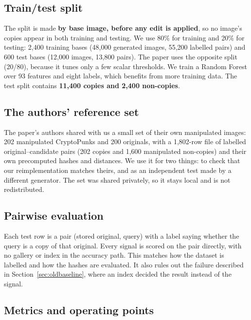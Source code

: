 \subsection{Train/test split}

The split is made \textbf{by base image, before any edit is applied}, so no image's copies
appear in both training and testing. We use 80\% for training and 20\% for testing: 2,400
training bases (48,000 generated images, 55,200 labelled pairs) and 600 test bases (12,000
images, 13,800 pairs). The paper uses the opposite split (20/80), because it tunes only a few
scalar thresholds. We train a Random Forest over 93 features and eight labels, which benefits
from more training data. The test split contains \textbf{11,400 copies and 2,400 non-copies}.

\subsection{The authors' reference set}

The paper's authors shared with us a small set of their own manipulated images: 202
manipulated CryptoPunks and 200 originals, with a 1,802-row file of labelled
original--candidate pairs (202 copies and 1,600 manipulated non-copies) and their own
precomputed hashes and distances. We use it for two things: to check that our reimplementation
matches theirs, and as an independent test made by a different generator. The set was shared
privately, so it stays local and is not redistributed.

\subsection{Pairwise evaluation}

Each test row is a pair (stored original, query) with a label saying whether the query is a
copy of that original. Every signal is scored on the pair directly, with no gallery or index in
the accuracy path. This matches how the dataset is labelled and how the hashes are evaluated.
It also rules out the failure described in Section~\ref{sec:oldbaseline}, where an index
decided the result instead of the signal.

\subsection{Metrics and operating points}

